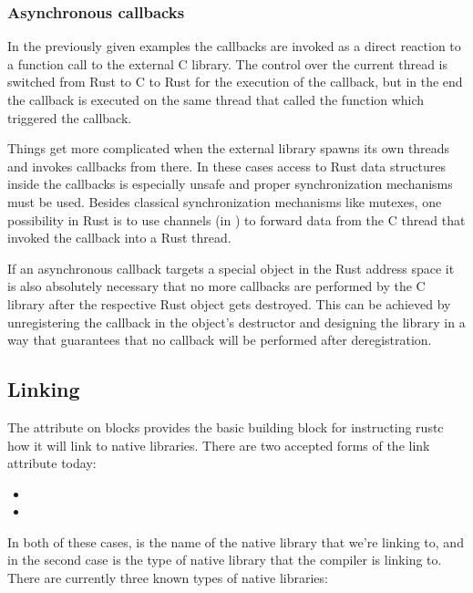 \subsubsection*{Asynchronous callbacks}

In the previously given examples the callbacks are invoked as a direct reaction to a function call to the external C 
library. The control over the current thread is switched from Rust to C to Rust for the execution of the callback, but 
in the end the callback is executed on the same thread that called the function which triggered the callback.

\blank

Things get more complicated when the external library spawns its own threads and invokes callbacks from there. In these 
cases access to Rust data structures inside the callbacks is especially unsafe and proper synchronization mechanisms must 
be used. Besides classical synchronization mechanisms like mutexes, one possibility in Rust is to use channels (in 
) to forward data from the C thread that invoked the callback into a Rust thread.

\blank

If an asynchronous callback targets a special object in the Rust address space it is also absolutely necessary that no more 
callbacks are performed by the C library after the respective Rust object gets destroyed. This can be achieved by unregistering 
the callback in the object's destructor and designing the library in a way that guarantees that no callback will be performed 
after deregistration.

\subsection*{Linking}

The  attribute on  blocks provides the basic building block for instructing rustc how it will 
link to native libraries. There are two accepted forms of the link attribute today:

\begin{itemize}
  \item{\code{\#[link(name = "foo")]}}
  \item{\code{\#[link(name = "foo", kind = "bar")]}}
\end{itemize}

In both of these cases,  is the name of the native library that we're linking to, and in the second case 
 is the type of native library that the compiler is linking to. There are currently three known types of 
native libraries:


